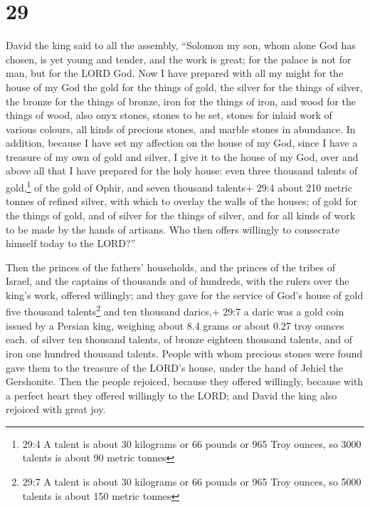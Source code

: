 \hypertarget{section-28}{%
\section{29}\label{section-28}}

 David the king said to all the assembly, ``Solomon my son,
whom alone God has chosen, is yet young and tender, and the work is
great; for the palace is not for man, but for the LORD God. 
Now I have prepared with all my might for the house of my God the gold
for the things of gold, the silver for the things of silver, the bronze
for the things of bronze, iron for the things of iron, and wood for the
things of wood, also onyx stones, stones to be set, stones for inlaid
work of various colours, all kinds of precious stones, and marble stones
in abundance.  In addition, because I have set my affection
on the house of my God, since I have a treasure of my own of gold and
silver, I give it to the house of my God, over and above all that I have
prepared for the holy house:  even three thousand talents of
gold,\footnote{29:4 A talent is about 30 kilograms or 66 pounds or 965
  Troy ounces, so 3000 talents is about 90 metric tonnes} of the gold of
Ophir, and seven thousand talents+ 29:4 about 210 metric tonnes of
refined silver, with which to overlay the walls of the houses;
 of gold for the things of gold, and of silver for the
things of silver, and for all kinds of work to be made by the hands of
artisans. Who then offers willingly to consecrate himself today to the
LORD?''

 Then the princes of the fathers' households, and the
princes of the tribes of Israel, and the captains of thousands and of
hundreds, with the rulers over the king's work, offered willingly;
 and they gave for the service of God's house of gold five
thousand talents\footnote{29:7 A talent is about 30 kilograms or 66
  pounds or 965 Troy ounces, so 5000 talents is about 150 metric tonnes}
and ten thousand darics,+ 29:7 a daric was a gold coin issued by a
Persian king, weighing about 8.4 grams or about 0.27 troy ounces each.
of silver ten thousand talents, of bronze eighteen thousand talents, and
of iron one hundred thousand talents.  People with whom
precious stones were found gave them to the treasure of the LORD's
house, under the hand of Jehiel the Gershonite.  Then the
people rejoiced, because they offered willingly, because with a perfect
heart they offered willingly to the LORD; and David the king also
rejoiced with great joy.

